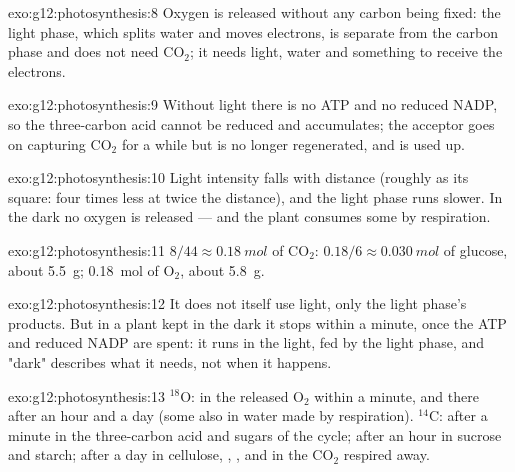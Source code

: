 \begin{solution}{exo:g12:photosynthesis:8}
Oxygen is released without any carbon being fixed: the light phase,
which splits water and moves electrons, is separate from the carbon
phase and does not need $\mathrm{CO_2}$; it needs light, water and
something to receive the electrons.
\end{solution}

\begin{solution}{exo:g12:photosynthesis:9}
Without light there is no ATP and no reduced NADP, so the three-carbon
acid cannot be reduced and accumulates; the acceptor goes on capturing
$\mathrm{CO_2}$ for a while but is no longer regenerated, and is used
up.
\end{solution}

\begin{solution}{exo:g12:photosynthesis:10}
Light intensity falls with distance (roughly as its square: four
times less at twice the distance), and the light phase runs slower.
In the dark no oxygen is released --- and the plant consumes some by
respiration.
\end{solution}

\begin{solution}{exo:g12:photosynthesis:11}
$8/44 \approx \qty{0.18}{mol}$ of $\mathrm{CO_2}$: $0.18/6 \approx
\qty{0.030}{mol}$ of glucose, about \qty{5.5}{g}; \qty{0.18}{mol} of
$\mathrm{O_2}$, about \qty{5.8}{g}.
\end{solution}

\begin{solution}{exo:g12:photosynthesis:12}
It does not itself use light, only the light phase's products. But
in a plant kept in the dark it stops within a minute, once the ATP
and reduced NADP are spent: it runs in the light, fed by the light
phase, and "dark" describes what it needs, not when it happens.
\end{solution}

\begin{solution}{exo:g12:photosynthesis:13}
$^{18}$O: in the released $\mathrm{O_2}$ within a minute, and there
after an hour and a day (some also in water made by respiration).
$^{14}$C: after a minute in the three-carbon acid and sugars of the
cycle; after an hour in sucrose and starch; after a day in cellulose,
, , and in the $\mathrm{CO_2}$ respired away.
\end{solution}


